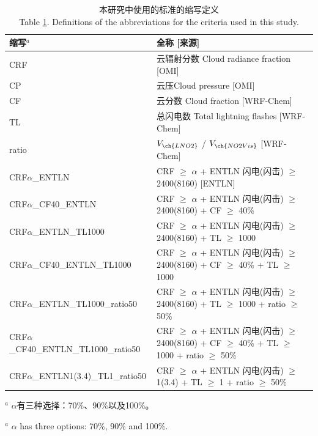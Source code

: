 \begin{table}[htbp]
\caption{本研究中使用的标准的缩写定义\\Table \ref{table:Abbreviations}. Definitions of the abbreviations for the criteria used in this study.}
\scriptsize
\begin{tabular}{ll}
\hline
缩写$^a$ & 全称 [来源] \\
\hline
CRF                             & 云辐射分数 Cloud radiance fraction [OMI] \\
CP                              & 云压Cloud pressure [OMI] \\
CF                              & 云分数 Cloud fraction [WRF-Chem] \\
TL                              & 总闪电数 Total lightning flashes [WRF-Chem] \\
ratio                           & $V_{\ch{LNO2}}$ / $V_{\ch{NO2Vis}}$ [WRF-Chem] \\
CRF$\alpha$\_ENTLN                   & CRF $\geq$ $\alpha$ + ENTLN 闪电(闪击) $\geq$ 2400(8160) [ENTLN]\\
CRF$\alpha$\_CF40\_ENTLN              & CRF $\geq$ $\alpha$ + ENTLN 闪电(闪击) $\geq$ 2400(8160) + CF $\geq$ 40\% \\
CRF$\alpha$\_ENTLN\_TL1000            & CRF $\geq$ $\alpha$ + ENTLN 闪电(闪击) $\geq$ 2400(8160) + TL $\geq$ 1000 \\
CRF$\alpha$\_CF40\_ENTLN\_TL1000      & CRF $\geq$ $\alpha$ + ENTLN 闪电(闪击) $\geq$ 2400(8160) + CF $\geq$ 40\% + TL $\geq$ 1000 \\
CRF$\alpha$\_ENTLN\_TL1000\_ratio50   & CRF $\geq$ $\alpha$ + ENTLN 闪电(闪击) $\geq$ 2400(8160) + TL $\geq$ 1000 + ratio $\geq$ 50\% \\
CRF$\alpha$\_CF40\_ENTLN\_TL1000\_ratio50 & CRF $\geq$ $\alpha$ + ENTLN 闪电(闪击) $\geq$ 2400(8160) + CF $\geq$ 40\% + TL $\geq$ 1000 + ratio $\geq$ 50\% \\
CRF$\alpha$\_ENTLN1(3.4)\_TL1\_ratio50    & CRF $\geq$ $\alpha$ + ENTLN 闪电(闪击) $\geq$ 1(3.4) + TL $\geq$ 1 + ratio $\geq$ 50\% \\
\hline
\end{tabular}
\begin{tablenotes}
\footnotesize
\item $^a$ $\alpha$有三种选择：70\%、90\%以及100\%。
\item $^a$ $\alpha$ has three options: 70\%, 90\% and 100\%.
\end{tablenotes}
\label{table:Abbreviations}
\end{table}


